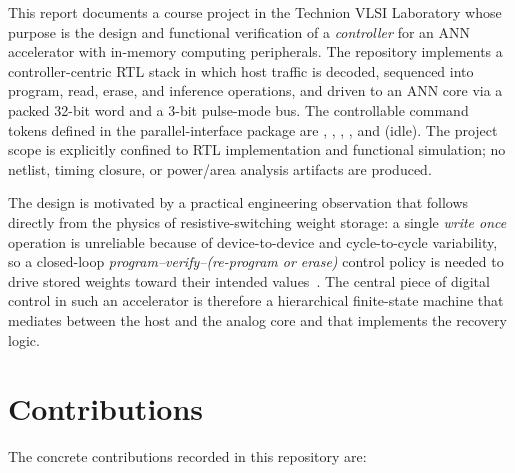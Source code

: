 This report documents a course project in the Technion VLSI Laboratory
whose purpose is the design and functional verification of a
\emph{controller} for an ANN accelerator with in-memory computing
peripherals. The repository implements a controller-centric RTL stack in
which host traffic is decoded, sequenced into program, read, erase, and
inference operations, and driven to an ANN core via a packed 32-bit word
and a 3-bit pulse-mode bus. The controllable command tokens defined in the
parallel-interface package are , ,
, , and  (idle). The project scope
is explicitly confined to RTL implementation and functional simulation;
no netlist, timing closure, or power/area analysis artifacts are produced.

The design is motivated by a practical engineering observation that follows
directly from the physics of resistive-switching weight storage: a single
\emph{write once} operation is unreliable because of device-to-device and
cycle-to-cycle variability, so a closed-loop
\emph{program--verify--(re-program or erase)} control policy is needed to
drive stored weights toward their intended values~\cite{Ielmini2018RRAM,
Sebastian2020IMC, Wang2022YFlash}. The central piece of digital control in
such an accelerator is therefore a hierarchical finite-state machine that
mediates between the host and the analog core and that implements the
recovery logic.

\section{Contributions}
\label{sec:intro-contributions}

The concrete contributions recorded in this repository are:

